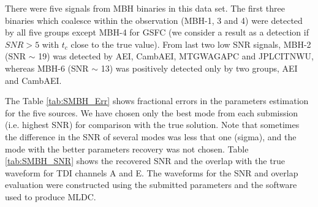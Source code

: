 \documentclass{iopart}
\begin{document}
There were five signals from MBH binaries in this data set. The first three binaries which coalesce within the 
observation (MBH-1, 3 and 4) were detected by all five groups except MBH-4 for GSFC (we consider a result as a detection if $SNR > 5$ with $t_{c}$ close to the true value). From last two low SNR signals, MBH-2 (SNR $\sim$ 19) was detected by AEI, CambAEI, MTGWAGAPC and JPLCITNWU, whereas MBH-6 (SNR $\sim$ 13) was positively detected only by two groups, AEI and CambAEI.  

The Table \ref{tab:SMBH_Err} shows fractional errors in the parameters estimation for the five sources. We have chosen only the best mode from each submission (i.e. highest SNR) for comparison with the true solution. Note that 
sometimes the difference in the SNR of several modes was less that one (sigma), and the mode with the better 
parameters recovery was not chosen.
Table \ref{tab:SMBH_SNR} shows the recovered SNR and the overlap with  the true waveform for TDI channels A and E. The waveforms for the SNR and overlap evaluation were constructed using the submitted parameters and the software
used to produce MLDC.
\end{document}
